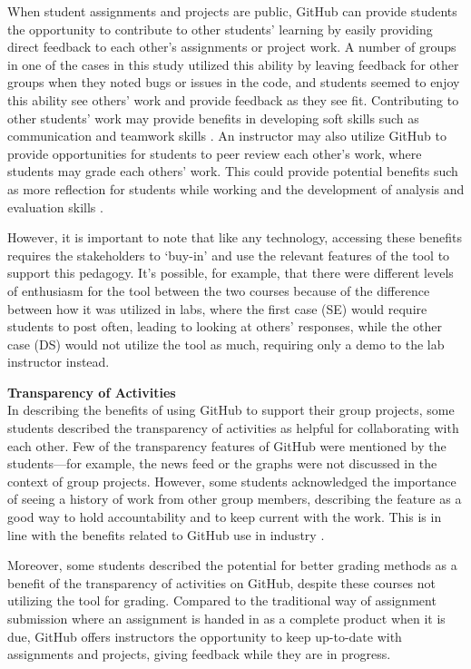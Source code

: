 When student assignments and projects are public, GitHub can provide students the opportunity to contribute to other students' learning by easily providing direct feedback to each other's assignments or project work. A number of groups in one of the cases in this study utilized this ability by leaving feedback for other groups when they noted bugs or issues in the code, and students seemed to enjoy this ability see others' work and provide feedback as they see fit. Contributing to other students' work may provide benefits in developing soft skills such as communication and teamwork skills \cite{hamer2006some}. An instructor may also utilize GitHub to provide opportunities for students to peer review each other's work, where students may grade each others' work. This could provide potential benefits such as more reflection for students while working and the development of analysis and evaluation skills \cite{sondergaard2012collaborative}.

However, it is important to note that like any technology, accessing these benefits requires the stakeholders to `buy-in' and use the relevant features of the tool to support this pedagogy. It's possible, for example, that there were different levels of enthusiasm for the tool between the two courses because of the difference between how it was utilized in labs, where the first case (SE) would require students to post often, leading to looking at others' responses, while the other case (DS) would not utilize the tool as much, requiring only a demo to the lab instructor instead.

\textbf{Transparency of Activities} \\
In describing the benefits of using GitHub to support their group projects, some students described the transparency of activities as helpful for collaborating with each other. Few of the transparency features of GitHub were mentioned by the students---for example, the news feed or the graphs were not discussed in the context of group projects. However, some students acknowledged the importance of seeing a history of work from other group members, describing the feature as a good way to hold accountability and to keep current with the work. This is in line with the benefits related to GitHub use in industry \cite{dabbish2012social}.

Moreover, some students described the potential for better grading methods as a benefit of the transparency of activities on GitHub, despite these courses not utilizing the tool for grading. Compared to the traditional way of assignment submission where an assignment is handed in as a complete product when it is due, GitHub offers instructors the opportunity to keep up-to-date with assignments and projects, giving feedback while they are in progress. \\

